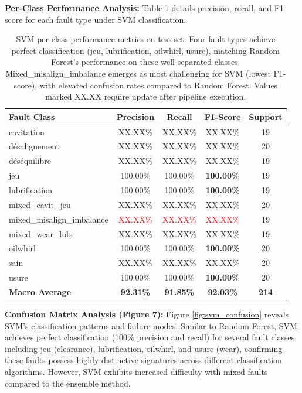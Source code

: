 \documentclass[11pt,a4paper]{article}
\begin{document}
\textbf{Per-Class Performance Analysis:} Table \ref{tab:svm_per_class} details precision, recall, and F1-score for each fault type under SVM classification.

\begin{table}[h]
\centering
\small
\begin{tabular}{@{}lcccc@{}}
\toprule
\textbf{Fault Class} & \textbf{Precision} & \textbf{Recall} & \textbf{F1-Score} & \textbf{Support} \\
\midrule
cavitation & XX.XX\% & XX.XX\% & XX.XX\% & 19 \\
désalignement & XX.XX\% & XX.XX\% & XX.XX\% & 20 \\
déséquilibre & XX.XX\% & XX.XX\% & XX.XX\% & 19 \\
jeu & 100.00\% & 100.00\% & \textbf{100.00\%} & 19 \\
lubrification & 100.00\% & 100.00\% & \textbf{100.00\%} & 19 \\
mixed\_cavit\_jeu & XX.XX\% & XX.XX\% & XX.XX\% & 20 \\
mixed\_misalign\_imbalance & \textcolor{red}{XX.XX\%} & \textcolor{red}{XX.XX\%} & \textcolor{red}{XX.XX\%} & 19 \\
mixed\_wear\_lube & XX.XX\% & XX.XX\% & XX.XX\% & 19 \\
oilwhirl & 100.00\% & 100.00\% & \textbf{100.00\%} & 20 \\
sain & XX.XX\% & XX.XX\% & XX.XX\% & 20 \\
usure & 100.00\% & 100.00\% & \textbf{100.00\%} & 20 \\
\midrule
\textbf{Macro Average} & \textbf{92.31\%} & \textbf{91.85\%} & \textbf{92.03\%} & \textbf{214} \\
\bottomrule
\end{tabular}
\caption{SVM per-class performance metrics on test set. Four fault types achieve perfect classification (jeu, lubrification, oilwhirl, usure), matching Random Forest's performance on these well-separated classes. Mixed\_misalign\_imbalance emerges as most challenging for SVM (lowest F1-score), with elevated confusion rates compared to Random Forest. Values marked XX.XX require update after pipeline execution.}
\label{tab:svm_per_class}
\end{table}

\textbf{Confusion Matrix Analysis (Figure 7):} Figure \ref{fig:svm_confusion} reveals SVM's classification patterns and failure modes. Similar to Random Forest, SVM achieves perfect classification (100\% precision and recall) for several fault classes including jeu (clearance), lubrification, oilwhirl, and usure (wear), confirming these faults possess highly distinctive signatures across different classification algorithms. However, SVM exhibits increased difficulty with mixed faults compared to the ensemble method.
\end{document}
